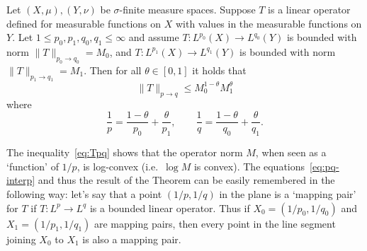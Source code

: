 \begin{theorem}
\label{thm:Riesz-Thorin}
Let $(X,\mu), (Y,\nu)$ be $\sigma$-finite measure spaces. Suppose $T$ is a linear operator defined for measurable functions on $X$ with values in the measurable functions on $Y$. Let $1\le p_0,p_1,q_0,q_1 \le\infty$ and assume
$T:L^{p_0}(X)\to L^{q_0}(Y)$ is bounded with norm $\|T\|_{p_0\to q_0}=M_0$, and $T:L^{p_1}(X)\to L^{q_1}(Y)$ is bounded with norm $\|T\|_{p_1\to q_1}=M_1$. Then for all $\theta\in [0,1]$ it holds that
\begin{equation}
\label{eq:Tpq}
    \|T\|_{p\to q} \le M_0^{1-\theta}M_1^\theta
\end{equation}
where
\begin{equation}
\label{eq:pq-interp}
    \frac{1}{p}=\frac{1-\theta}{p_0}+\frac{\theta}{p_1}, \qquad \frac{1}{q}=\frac{1-\theta}{q_0}+\frac{\theta}{q_1}.
\end{equation}
\end{theorem}

\begin{remark}
The inequality~\eqref{eq:Tpq} shows that the operator norm $M$, when seen as a `function' of $1/p$, is log-convex (i.e.\ $\log M$ is convex). The equations~\eqref{eq:pq-interp} and thus the result of the Theorem can be easily remembered in the following way: let's say that a point $(1/p,1/q)$ in the plane is a `mapping pair' for $T$ if $T:L^p \to L^q$ is a bounded linear operator. Thus if $X_0=(1/p_0,1/q_0)$ and $X_1=(1/p_1,1/q_1)$ are mapping pairs, then every point in the line segment joining $X_0$ to $X_1$ is also a mapping pair.
\end{remark}

